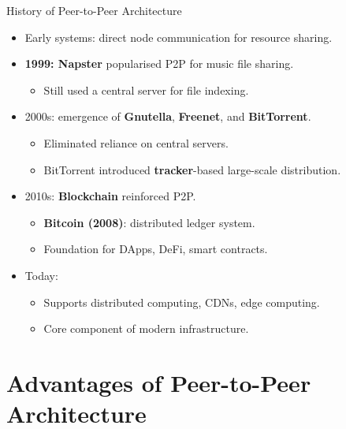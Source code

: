 \documentclass[aspectratio=169, table]{beamer}
\begin{document}
\begin{frame}{History of Peer-to-Peer Architecture}
	\vspace{20pt}
	\begin{itemize}
		\item Early systems: direct node communication for resource sharing.
		\item \textbf{1999: Napster} popularised P2P for music file sharing.
		\begin{itemize}
			\item Still used a central server for file indexing.
		\end{itemize}
		\item 2000s: emergence of \textbf{Gnutella}, \textbf{Freenet}, and \textbf{BitTorrent}.
		\begin{itemize}
			\item Eliminated reliance on central servers.
			\item BitTorrent introduced \textbf{tracker}-based large-scale distribution.
		\end{itemize}
		\item 2010s: \textbf{Blockchain} reinforced P2P.
		\begin{itemize}
			\item \textbf{Bitcoin (2008)}: distributed ledger system.
			\item Foundation for DApps, DeFi, smart contracts.
		\end{itemize}
		\item Today:
		\begin{itemize}
			\item Supports distributed computing, CDNs, edge computing.
			\item Core component of modern infrastructure.
		\end{itemize}
	\end{itemize}
\end{frame}


\section{Advantages of Peer-to-Peer Architecture}
\end{document}
